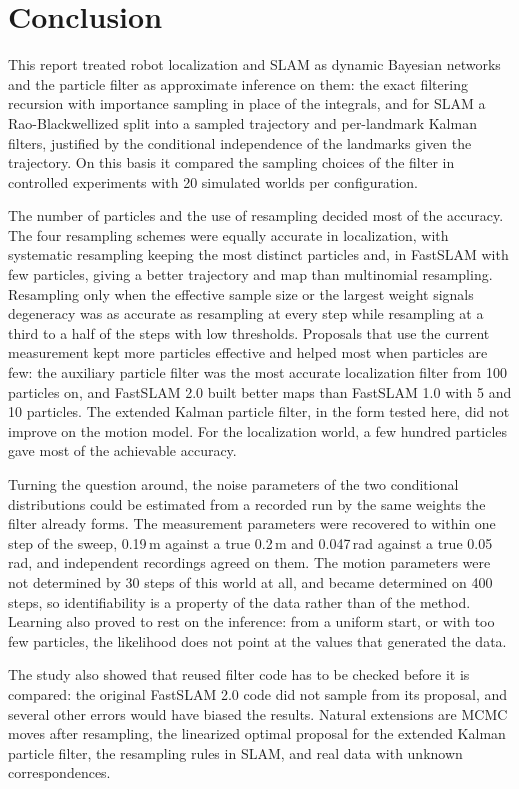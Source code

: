 \section{Conclusion}\label{sec:conclusion}

This report treated robot localization and SLAM as dynamic Bayesian networks and the particle filter as approximate
inference on them: the exact filtering recursion with importance sampling in place of the integrals, and for SLAM a
Rao-Blackwellized split into a sampled trajectory and per-landmark Kalman filters, justified by the conditional
independence of the landmarks given the trajectory. On this basis it compared the sampling choices of the filter in
controlled experiments with 20 simulated worlds per configuration.

The number of particles and the use of resampling decided most of the accuracy. The four resampling schemes were equally
accurate in localization, with systematic resampling keeping the most distinct particles and, in FastSLAM with few
particles, giving a better trajectory and map than multinomial resampling. Resampling only when the effective sample
size or the largest weight signals degeneracy was as accurate as resampling at every step while resampling at a third
to a half of the steps with low thresholds. Proposals that use the current measurement kept more particles effective
and helped most when particles are few: the auxiliary particle filter was the most accurate localization filter from
100 particles on, and FastSLAM 2.0 built better maps than FastSLAM 1.0 with 5 and 10 particles. The extended Kalman
particle filter, in the form tested here, did not improve on the motion model. For the localization world, a few hundred
particles gave most of the achievable accuracy.

Turning the question around, the noise parameters of the two conditional distributions could be estimated from a
recorded run by the same weights the filter already forms. The measurement parameters were recovered to within one
step of the sweep, 0.19\,m against a true 0.2\,m and 0.047\,rad against a true 0.05\,rad, and independent
recordings agreed on them. The motion parameters were not determined by 30 steps of this world at all, and became
determined on 400 steps, so identifiability is a property of the data rather than of the method. Learning also
proved to rest on the inference: from a uniform start, or with too few particles, the likelihood does not point
at the values that generated the data.

The study also showed that reused filter code has to be checked before it is compared: the original FastSLAM 2.0 code
did not sample from its proposal, and several other errors would have biased the results. Natural extensions are MCMC
moves after resampling, the linearized optimal proposal for the extended Kalman particle filter, the resampling rules in
SLAM, and real data with unknown correspondences.
